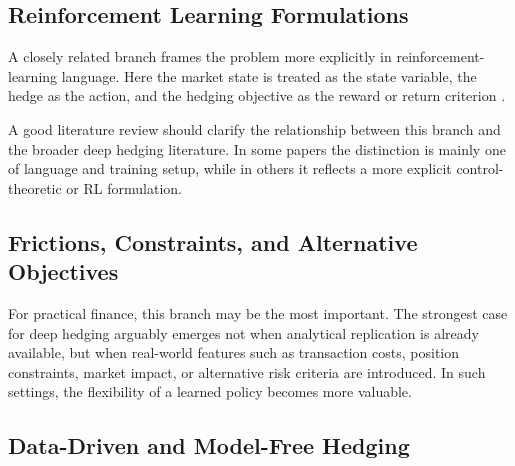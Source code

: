 \documentclass[12pt, a4paper]{article}
\begin{document}

\subsection{Reinforcement Learning Formulations}
\label{subsec:rl}

A closely related branch frames the problem more explicitly in reinforcement-learning
language. Here the market state is treated as the state variable, the hedge as the
action, and the hedging objective as the reward or return criterion \citep{DuEtAl2020}.

A good literature review should clarify the relationship between this branch and the
broader deep hedging literature. In some papers the distinction is mainly one of
language and training setup, while in others it reflects a more explicit
control-theoretic or RL formulation.

\subsection{Frictions, Constraints, and Alternative Objectives}
\label{subsec:frictions}

For practical finance, this branch may be the most important. The strongest case for
deep hedging arguably emerges not when analytical replication is already available,
but when real-world features such as transaction costs, position constraints, market
impact, or alternative risk criteria are introduced. In such settings, the flexibility
of a learned policy becomes more valuable.

%

\subsection{Data-Driven and Model-Free Hedging}
\label{subsec:data_driven}
\end{document}
